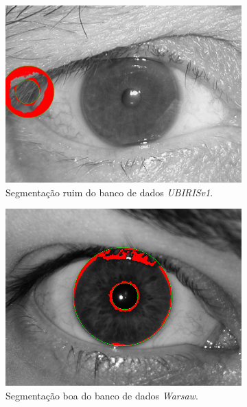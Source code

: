 \begin{figure}[H]
\medskip
\begin{subfigure}{0.25\textwidth}
  \includegraphics[width=\linewidth]{img/Resultados/ubirisv1/ubirisv1_seg_ruim.jpg}
  \caption{Segmentação ruim do banco de dados \textit{UBIRISv1}.}
\end{subfigure}\hfil %
\begin{subfigure}{0.25\textwidth}
  \includegraphics[width=\linewidth]{img/Resultados/warsaw/warsaw_seg_boa.jpg}
  \caption{Segmentação boa do banco de dados \textit{\acrshort{Warsaw}}.}
\end{subfigure}\hfil %
\begin{subfigure}{0.25\textwidth}

\end{subfigure}
\end{figure}
